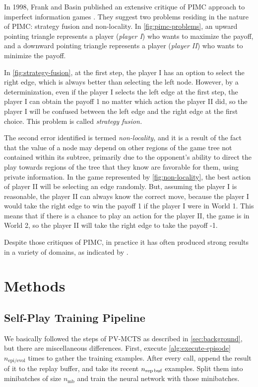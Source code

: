\documentclass[10pt,twocolumn,letterpaper]{article}
\begin{document}
In 1998, Frank and Basin published an extensive critique of PIMC approach to imperfect information games \cite{FraBas1998}. They suggest two problems residing in the nature of PIMC: strategy fusion and non-locality. In \cref{fig:pimc-problems}, an upward pointing triangle represents a player (\textit{player I}) who wants to maximize the payoff, and a downward pointing triangle represents a player (\textit{player II}) who wants to minimize the payoff.

In \cref{fig:strategy-fusion}, at the first step, the player I has an option to select the right edge, which is always better than selecting the left node. However, by a determinization, even if the player I selects the left edge at the first step, the player I can obtain the payoff 1 no matter which action the player II did, so the player I will be confused between the left edge and the right edge at the first choice. This problem is called \textit{strategy fusion.}

The second error identified is termed \textit{non-locality,} and it is a result of the fact that the value of a node may depend on other regions of the game tree not contained within its subtree, primarily due to the opponent's ability to direct the play towards regions of the tree that they know are favorable for them, using private information. In the game represented by \cref{fig:non-locality}, the best action of player II will be selecting an edge randomly. But, assuming the player I is reasonable, the player II can always know the correct move, because the player I would take the right edge to win the payoff 1 if the player I were in World 1. This means that if there is a chance to play an action for the player II, the game is in World 2, so the player II will take the right edge to take the payoff -1.

Despite those critiques of PIMC, in practice it has often produced strong results in a variety of domains, as indicated by \cite{LonStu2010}.

\section{Methods}
\subsection{Self-Play Training Pipeline}
We basically followed the steps of PV-MCTS as described in \cref{sec:background}, but there are miscellaneous differences. First, execute \cref{alg:execute-episode} $n_\text{epi/evol}$ times to gather the training examples. After every call, append the result of it to the replay buffer, and take its recent $n_\text{rep\,buf}$ examples. Split them into minibatches of size $n_\text{mb}$ and train the neural network with those minibatches.
\end{document}
